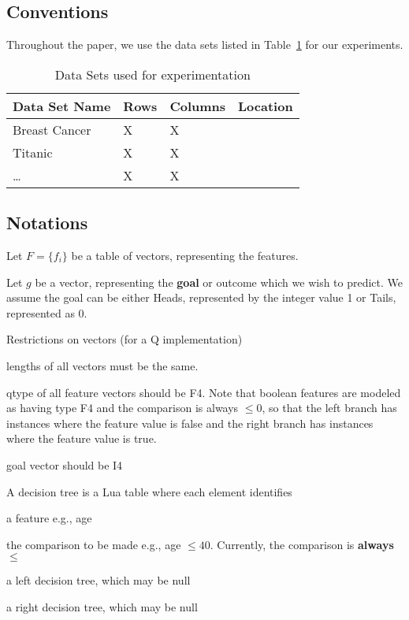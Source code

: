 \subsection{Conventions}
Throughout the paper, we use the data sets listed in Table~\ref{tbl_data_sets}
for our experiments. 
\begin{table}
\centering
\begin{tabular}{|l|l|l|l|} \hline \hline
{\bf Data Set Name } & {\bf Rows} & {\bf Columns} & {\bf Location} \\ \hline 
Breast Cancer & X & X & \\ \hline
Titanic & X & X & \\ \hline
\ldots & X & X & \\ \hline
\end{tabular}
\label{tbl_data_sets}
\caption{Data Sets used for experimentation}
\end{table}

\subsection{Notations}

\bi
\item Let \(F = \{f_i\}\) be a table of vectors, representing the features.
\item Let \(g\) be a vector, representing the {\bf goal} or 
outcome which we wish to
predict. We assume the goal can be either Heads, represented by the integer value 1 or Tails, represented as 0.
\item Restrictions on vectors (for a Q implementation)
\be
\item lengths of all vectors must be the same. 
\item qtype of all feature vectors should be F4. 
Note that boolean features are
modeled as having type F4 and the comparison is always \(\leq 0\), so that the
left branch has instances where the feature value is false and the
right branch has instances where the feature value is true.
\item goal vector should be I4
\ee
\ei

A decision tree is a Lua table where each element identifies
\be
\item a feature e.g., age
\item the comparison to be made e.g., age \(\leq 40\). Currently, the comparison
is {\bf always} \(\leq\)
\item a left decision tree, which may be null
\item a right decision tree, which may be null
\ee

